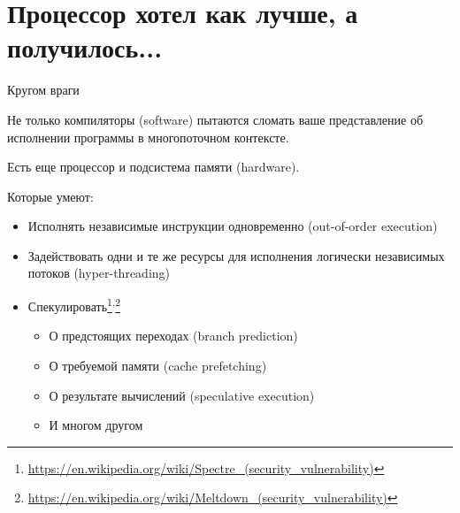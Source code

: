 
\section{Процессор хотел как лучше, а получилось...}
\showTOC

\begin{frame}{Кругом враги}

Не только компиляторы (software) пытаются сломать ваше представление об исполнении программы в многопоточном контексте. 

\pause
Есть еще процессор и подсистема памяти (hardware). 

\pause
Которые умеют:
\begin{itemize}
    \pause
    \item Исполнять независимые инструкции одновременно (out-of-order execution)

    \pause
    \item Задействовать одни и те же ресурсы для исполнения логически независимых потоков (hyper-threading)

    \pause
    \item Спекулировать\footnote<6->{\tiny\url{https://en.wikipedia.org/wiki/Spectre_(security_vulnerability)}}\textsuperscript{,}\footnote<6->{\tiny\url{https://en.wikipedia.org/wiki/Meltdown_(security_vulnerability)}}
    \begin{itemize}
        \item О предстоящих переходах (branch prediction)
        \item О требуемой памяти (cache prefetching)
        \item О результате вычислений (speculative execution)
        \item И многом другом
    \end{itemize}
\end{itemize}

\end{frame}

